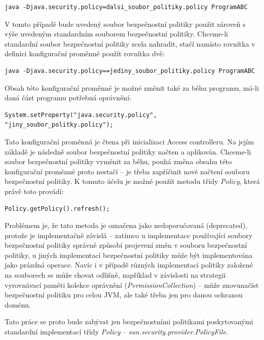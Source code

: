 \begin{verbatim}
java -Djava.security.policy=dalsi_soubor_politiky.policy ProgramABC
\end{verbatim}

V tomto případě bude uvedený soubor bezpečnostní politiky použit zároveň s výše uvedeným standardním souborem bezpečnostní politiky. Chceme-li standardní soubor bezpečnostní politiky zcela nahradit, stačí namísto rovnítka v definici konfigurační proměnné použít rovnítka dvě: \cite[5.3.1]{oaks}

\begin{verbatim}
java -Djava.security.policy==jediny_soubor_politiky.policy ProgramABC
\end{verbatim}

Obsah této konfigurační proměnné je možné změnit také za běhu programu, má-li daná část programu potřebná oprávnění:

\begin{verbatim}
System.setProperty("java.security.policy", "jiny_soubor_politky.policy");
\end{verbatim}

Tato konfigurační proměnná je čtena při inicializaci Access controlleru. Na jejím základě je následně soubor bezpečnostní politiky načten a aplikován. Chceme-li soubor bezpečnostní politiky vyměnit za běhu, pouhá změna obsahu této konfigurační proměnné proto nestačí -- je třeba zapříčinit nové načtení souboru bezpečnostní politiky. K tomuto účelu je možné použít metodu třídy {\it Policy}, která právě toto provádí:

\begin{verbatim}
Policy.getPolicy().refresh();
\end{verbatim}

Problémem je, že tato metoda je označena jako nedoporučovaná (deprecated), protože je implementačně závislá -- zatímco u implementace používající soubory bezpečnostní politiky správně způsobí projevení změn v souboru bezpečnostní politiky, u jiných implementací bezpečnostní politiky může být implementována jako prázdná operace. Navíc i v případě různých implementací politiky založené na souborech se může chovat odlišně, například v závislosti na strategii vyrovnávací paměti kolekce oprávnění ({\it PermissionCollection}) -- může znovunačíst bezpečnostní politiku pro celou JVM, ale také třeba jen pro danou ochranou doménu. \cite{refPolicy}

Tato práce se proto bude zabývat jen bezpečnostními politikami poskytovanými standardní implementací třídy {\it Policy} -- {\it sun.security.provider.PolicyFile}.

